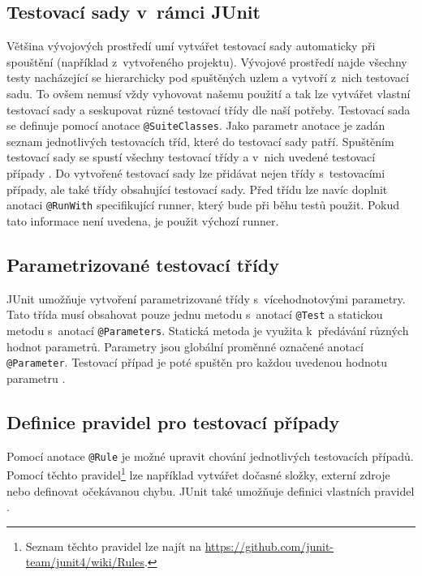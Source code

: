     \subsection{Testovací sady v~rámci JUnit}
    Většina vývojových prostředí umí vytvářet testovací sady automaticky při spouštění (například z~vytvořeného projektu). Vývojové prostředí najde všechny testy nacházející se hierarchicky pod spuštěných uzlem a vytvoří z~nich testovací sadu. To ovšem nemusí vždy vyhovovat našemu použití a tak lze vytvářet vlastní testovací sady a seskupovat různé testovací třídy dle naší potřeby. Testovací sada se definuje pomocí anotace \texttt{@SuiteClasses}. Jako parametr anotace je zadán seznam jednotlivých testovacích tříd, které do testovací sady patří. Spuštěním testovací sady se spustí všechny testovací třídy a v~nich uvedené testovací případy \cite{vogella:JUnit}. Do vytvořené testovací sady lze přidávat nejen třídy s~testovacími případy, ale také třídy obsahující testovací sady. Před třídu lze navíc doplnit anotaci \texttt{@RunWith} specifikující runner, který bude při běhu testů použit. Pokud tato informace není uvedena, je použit výchozí runner.

    \subsection{Parametrizované testovací třídy}
    JUnit umožňuje vytvoření parametrizované třídy s~vícehodnotovými parametry. Tato třída musí obsahovat pouze jednu metodu s~anotací \texttt{@Test} a statickou metodu s~anotací \texttt{@Parameters}. Statická metoda je využita k~předávání různých hodnot parametrů. Parametry jsou globální proměnné označené anotací \texttt{@Parameter}. Testovací případ je poté spuštěn pro každou uvedenou hodnotu parametru \cite{vogella:JUnit}.

    \subsection{Definice pravidel pro testovací případy}
    Pomocí anotace \texttt{@Rule} je možné upravit chování jednotlivých testovacích případů. Pomocí těchto pravidel\footnote{Seznam těchto pravidel lze najít na \url{https://github.com/junit-team/junit4/wiki/Rules}.} lze například vytvářet dočasné složky, externí zdroje nebo definovat očekávanou chybu. JUnit také umožňuje definici vlastních pravidel \cite{vogella:JUnit}.

